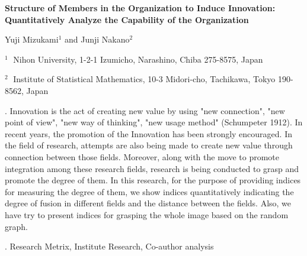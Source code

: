\documentclass[12pt]{article}
\begin{document}
\begin{flushleft}


{\LARGE\bf Structure of Members in the Organization to Induce Innovation: Quantitatively Analyze the Capability of the Organization}


\vspace{1.0cm}

Yuji Mizukami$^1$ and Junji Nakano$^2$

\begin{description}

\item $^1 \;$ Nihon University, 1-2-1 Izumicho, Narashino, Chiba 275-8575, Japan

\item $^2 \;$ Institute of Statistical Mathematics, 10-3 Midori-cho, Tachikawa, Tokyo 190-8562, Japan

\end{description}

\end{flushleft}


\vspace{0.75cm}

. Innovation is the act of creating new value by using "new connection", "new point of view", "new way of thinking", "new usage method" (Schumpeter 1912). In recent years, the promotion of the Innovation has been strongly encouraged. In the field of research, attempts are also being made to create new value through connection between those fields. Moreover, along with the move to promote integration among these research fields, research is being conducted to grasp and promote the degree of them. 
In this research, for the purpose of providing indices for measuring the degree of them, we show indices quantitatively indicating the degree of fusion in different fields and the distance between the fields. Also, we have try to present indices for grasping the whole image based on the random graph.

\vskip 2mm

.
Research Metrix, Institute Research, Co-author analysis
\end{document}
